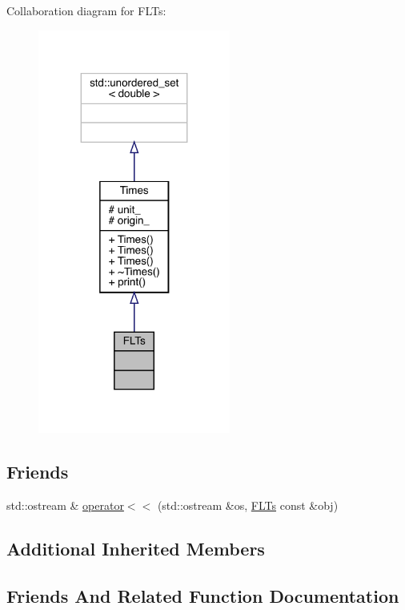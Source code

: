Collaboration diagram for F\+L\+Ts\+:
\nopagebreak
\begin{figure}[H]
\begin{center}
\leavevmode
\includegraphics[width=179pt]{class_f_l_ts__coll__graph}
\end{center}
\end{figure}
\subsection*{Friends}
\begin{DoxyCompactItemize}
\item 
std\+::ostream \& \mbox{\hyperlink{class_f_l_ts_ae6eedde5f18b77e7a2922bc9a3f6b8bf}{operator$<$$<$}} (std\+::ostream \&os, \mbox{\hyperlink{class_f_l_ts}{F\+L\+Ts}} const \&obj)
\end{DoxyCompactItemize}
\subsection*{Additional Inherited Members}


\subsection{Friends And Related Function Documentation}
\mbox{\label{class_f_l_ts_ae6eedde5f18b77e7a2922bc9a3f6b8bf}} 
